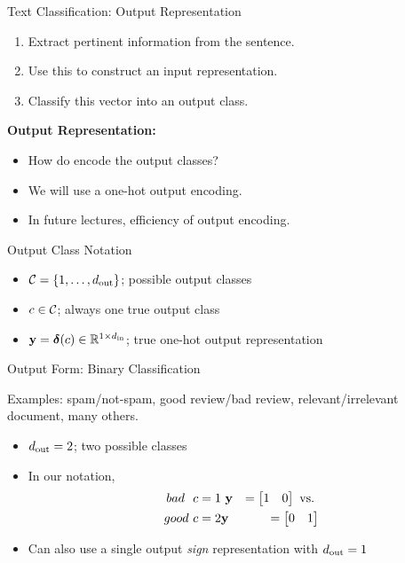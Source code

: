 \documentclass{beamer}
\begin{document}
\begin{frame}{Text Classification: Output Representation}
  \begin{enumerate}
  \item Extract pertinent information from the sentence. 
    \air 

  \item Use this to construct an input representation.
    \air

  \item Classify this vector into an output class.
  \end{enumerate}

  \air


  \textbf{Output Representation:}

  \begin{itemize}
  \item How do encode the output classes?
  \item We will use a one-hot output encoding.
  \item In future lectures, efficiency of output encoding.
  \end{itemize}
\end{frame}




\begin{frame}{Output Class Notation}
  \begin{itemize}
  \item $\mathcal{C} = \{1, \ldots, {d_{\mathrm{out}}}\}$; possible output classes
  \item $c \in \mathcal{C}$; always one true output class 
  \item $\mathbf{y} = \boldsymbol{\delta}(c) \in \mathbb{R}^{1\times {d_{\mathrm{in}}}}$; true one-hot output representation

  \end{itemize}
\end{frame}

\begin{frame}{Output Form: Binary Classification}

  Examples: spam/not-spam, good review/bad review, relevant/irrelevant document, many others.   
  \begin{itemize}
  \item ${d_{\mathrm{out}}} = 2$; two possible classes
  \item In our notation,
    \begin{eqnarray*} 
    bad \ \ c = 1 & \  \mathbf{y} &= \begin{bmatrix} 1 & 0  \end{bmatrix}  \mathrm {\ vs. \ } \\
    good \ c = 2 & \mathbf{y} &= \begin{bmatrix} 0  & 1  \end{bmatrix} 
   \end{eqnarray*} 
   \item Can also use a single output \textit{sign} representation with ${d_{\mathrm{out}}} = 1$ 
  \end{itemize}

\end{frame}
\end{document}
